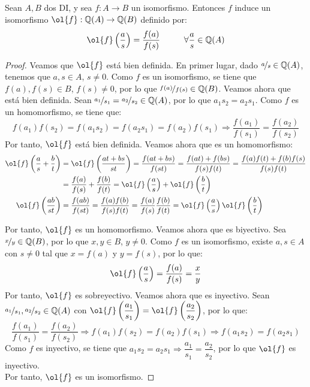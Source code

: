 \begin{prop}
    Sean $A,B$ dos DI, y sea $f:A\rightarrow B$ un isomorfismo.
    Entonces $f$ induce un isomorfismo $\ol{f}:\Q(A)\rightarrow \Q(B)$ definido por:
    $$\ol{f}\left(\dfrac{a}{s}\right) = \dfrac{f(a)}{f(s)}\hspace{1cm}\forall \dfrac{a}{s} \in \Q(A)$$
    \begin{proof}
        Veamos que $\ol{f}$ está bien definida. En primer lugar, dado $\nicefrac{a}{s} \in \mathbb Q(A)$, tenemos que $a,s \in A$, $s\neq 0$. Como $f$ es un isomorfismo, se tiene que $f(a), f(s) \in B$, $f(s) \neq 0$, por lo que $\nicefrac{f(a)}{f(s)} \in \mathbb Q(B)$. Veamos ahora que está bien definida.  Sean $\nicefrac{a_1}{s_1} = \nicefrac{a_2}{s_2} \in \mathbb Q(A)$, por lo que $a_1s_2 = a_2s_1$. Como $f$ es un homomorfismo, se tiene que:
        $$f(a_1)f(s_2) = f(a_1s_2) = f(a_2s_1) = f(a_2)f(s_1) \Longrightarrow \dfrac{f(a_1)}{f(s_1)} = \dfrac{f(a_2)}{f(s_2)}$$
        Por tanto, $\ol{f}$ está bien definida. Veamos ahora que es un homomorfismo:
        \begin{align*}
            \ol{f}\left(\dfrac{a}{s} + \dfrac{b}{t}\right) &= \ol{f}\left(\dfrac{at + bs}{st}\right) = \dfrac{f(at+bs)}{f(st)}
            = \dfrac{f(at)+f(bs)}{f(s)f(t)} = \dfrac{f(a)f(t)+f(b)f(s)}{f(s)f(t)}\\
            &= \dfrac{f(a)}{f(s)} + \dfrac{f(b)}{f(t)} = \ol{f}\left(\dfrac{a}{s}\right) + \ol{f}\left(\dfrac{b}{t}\right)\\
            \ol{f}\left(\dfrac{ab}{st}\right) & = \dfrac{f(ab)}{f(st)} = \dfrac{f(a)f(b)}{f(s)f(t)} = \dfrac{f(a)}{f(s)}\dfrac{f(b)}{f(t)} = \ol{f}\left(\dfrac{a}{s}\right)\ol{f}\left(\dfrac{b}{t}\right)
        \end{align*}
        
        Por tanto, $\ol{f}$ es un homomorfismo. Veamos ahora que es biyectivo. Sea $\nicefrac{x}{y} \in \mathbb Q(B)$, por lo que $x,y\in B$, $y\neq 0$. Como $f$ es un isomorfismo, existe $a,s\in A$ con $s\neq 0$ tal que $x=f(a)$ y $y=f(s)$, por lo que:
        $$\ol{f}\left(\dfrac{a}{s}\right) = \dfrac{f(a)}{f(s)} = \dfrac{x}{y}$$
        Por tanto, $\ol{f}$ es sobreyectivo. Veamos ahora que es inyectivo. Sean $\nicefrac{a_1}{s_1}, \nicefrac{a_2}{s_2} \in \mathbb Q(A)$ con $\ol{f}\left(\dfrac{a_1}{s_1}\right) = \ol{f}\left(\dfrac{a_2}{s_2}\right)$, por lo que:
        $$\dfrac{f(a_1)}{f(s_1)} = \dfrac{f(a_2)}{f(s_2)} \Longrightarrow f(a_1)f(s_2) = f(a_2)f(s_1) \Longrightarrow f(a_1s_2) = f(a_2s_1)$$
        Como $f$ es inyectivo, se tiene que $a_1s_2 = a_2s_1 \Longrightarrow \dfrac{a_1}{s_1} = \dfrac{a_2}{s_2}$, por lo que $\ol{f}$ es inyectivo.\\
        Por tanto, $\ol{f}$ es un isomorfismo.
    \end{proof}
\end{prop}

